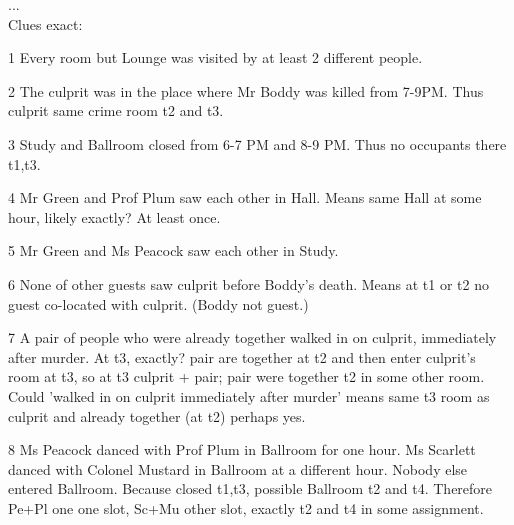 \begin{tcolorbox}[
    title=\textbf{GPT-5.6-Sol Maximal-Deliberation Reasoning Process},
    colback=white,
    colframe=black!40,
    boxrule=0.6pt,
    arc=1.5mm,
    fontupper=\scriptsize,
    fonttitle=\footnotesize\bfseries,
    left=2mm,
    right=2mm,
    top=1mm,
    bottom=1mm,
    boxsep=1mm,
    before skip=3pt,
    after skip=3pt,
    breakable
]
...\\
Clues exact:

1 Every room but Lounge was visited by at least 2 different people.

2 The culprit was in the place where Mr Boddy was killed from 7-9PM. Thus culprit same crime room t2 and t3.

3 Study and Ballroom closed from 6-7 PM and 8-9 PM. Thus no occupants there t1,t3.

4 Mr Green and Prof Plum saw each other in Hall. Means same Hall at some hour, likely exactly? At least once.

5 Mr Green and Ms Peacock saw each other in Study.

6 None of other guests saw culprit before Boddy's death. Means at t1 or t2 no guest co-located with culprit. (Boddy not guest.)

7 A pair of people who were already together walked in on culprit, immediately after murder. At t3, exactly? pair are together at t2 and then enter culprit's room at t3, so at t3 culprit + pair; pair were together t2 in some other room. Could 'walked in on culprit immediately after murder' means same t3 room as culprit and already together (at t2) perhaps yes.

8 Ms Peacock danced with Prof Plum in Ballroom for one hour. Ms Scarlett danced with Colonel Mustard in Ballroom at a different hour. Nobody else entered Ballroom. Because closed t1,t3, possible Ballroom t2 and t4. Therefore Pe+Pl one one slot, Sc+Mu other slot, exactly t2 and t4 in some assignment.


\end{tcolorbox}
